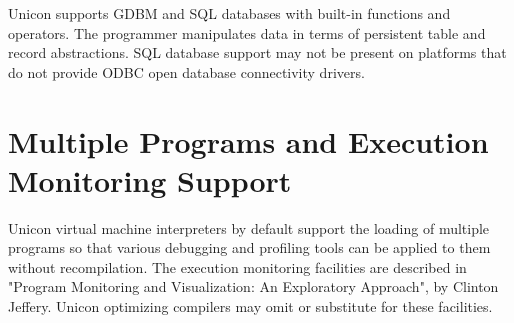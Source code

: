 Unicon supports GDBM and SQL databases with
built-in functions and operators. The programmer manipulates data in
terms of persistent table and record abstractions. SQL database support
may not be present on platforms that do not provide ODBC
open database connectivity drivers.

\section{Multiple Programs and Execution Monitoring Support}

Unicon virtual machine interpreters by default support the loading of
multiple programs so that various debugging and profiling tools can be
applied to them without recompilation. The execution monitoring
facilities are described in "Program Monitoring and
Visualization: An Exploratory Approach", by Clinton
Jeffery. Unicon optimizing compilers may
omit or substitute for these facilities.
